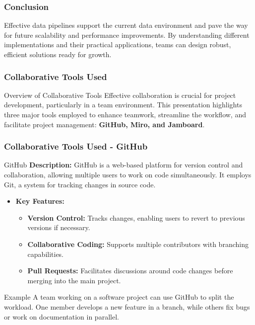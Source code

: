 \documentclass[aspectratio=169]{beamer}
\begin{document}
\begin{frame}
    \frametitle{Conclusion}
    Effective data pipelines support the current data environment and pave the way for future scalability and performance improvements. By understanding different implementations and their practical applications, teams can design robust, efficient solutions ready for growth.
\end{frame}

\begin{frame}[fragile]
    \frametitle{Collaborative Tools Used}
    \begin{block}{Overview of Collaborative Tools}
        Effective collaboration is crucial for project development, particularly in a team environment. This presentation highlights three major tools employed to enhance teamwork, streamline the workflow, and facilitate project management: \textbf{GitHub, Miro, and Jamboard}.
    \end{block}
\end{frame}

\begin{frame}[fragile]
    \frametitle{Collaborative Tools Used - GitHub}
    \begin{block}{GitHub}
        \textbf{Description:} GitHub is a web-based platform for version control and collaboration, allowing multiple users to work on code simultaneously. It employs Git, a system for tracking changes in source code.
    \end{block}
    \begin{itemize}
        \item \textbf{Key Features:}
        \begin{itemize}
            \item \textbf{Version Control:} Tracks changes, enabling users to revert to previous versions if necessary.
            \item \textbf{Collaborative Coding:} Supports multiple contributors with branching capabilities.
            \item \textbf{Pull Requests:} Facilitates discussions around code changes before merging into the main project.
        \end{itemize}
    \end{itemize}
    \begin{block}{Example}
        A team working on a software project can use GitHub to split the workload. One member develops a new feature in a branch, while others fix bugs or work on documentation in parallel.
    \end{block}
\end{frame}
\end{document}
